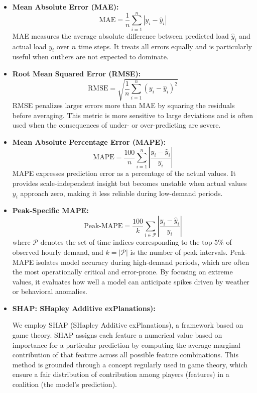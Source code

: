 \documentclass[final,numbered]{ifacconf}
\begin{document}
\begin{itemize}

    \item \textbf{Mean Absolute Error (MAE):}
    \[
    \text{MAE} = \frac{1}{n} \sum_{i=1}^{n} \left| y_i - \hat{y}_i \right|
    \]
    MAE measures the average absolute difference between predicted load $\hat{y}_i$ and actual load $y_i$ over $n$ time steps. It treats all errors equally and is particularly useful when outliers are not expected to dominate.
    \newline\item \textbf{Root Mean Squared Error (RMSE):}
    \[
    \text{RMSE} = \sqrt{ \frac{1}{n} \sum_{i=1}^{n} \left( y_i - \hat{y}_i \right)^2 }
    \]
    RMSE penalizes larger errors more than MAE by squaring the residuals before averaging. This metric is more sensitive to large deviations and is often used when the consequences of under- or over-predicting are severe.
    \newline
    \item \textbf{Mean Absolute Percentage Error (MAPE):}
    \[
    \text{MAPE} = \frac{100}{n} \sum_{i=1}^{n} \left| \frac{y_i - \hat{y}_i}{y_i} \right|
    \]
    MAPE expresses prediction error as a percentage of the actual values. It provides scale-independent insight but becomes unstable when actual values $y_i$ approach zero, making it less reliable during low-demand periods.
    \newline
    \item \textbf{Peak-Specific MAPE:}
    \[
    \text{Peak-MAPE} = \frac{100}{k} \sum_{i \in \mathcal{P}} \left| \frac{y_i - \hat{y}_i}{y_i} \right|
    \]
    where $\mathcal{P}$ denotes the set of time indices corresponding to the top 5\% of observed hourly demand, and $k = |\mathcal{P}|$ is the number of peak intervals. Peak-MAPE isolates model accuracy during high-demand periods, which are often the most operationally critical and error-prone. By focusing on extreme values, it evaluates how well a model can anticipate spikes driven by weather or behavioral anomalies.
    \newline
    \item \textbf{SHAP: SHapley Additive exPlanations):}

We employ SHAP (SHapley Additive exPlanations), a framework based on  game theory. SHAP assigns each feature a numerical value based on importance for a particular prediction by computing the average marginal contribution of that feature across all possible feature combinations. This method is grounded through a concept regularly used  in game theory, which ensure a fair distribution of contribution among players (features) in a coalition (the model's prediction).


\end{itemize}
\end{document}
